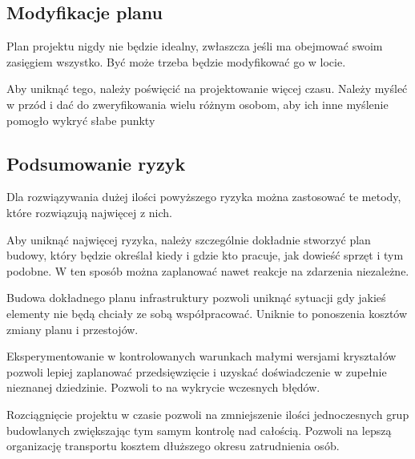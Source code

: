 \subsection{Modyfikacje planu}
Plan projektu nigdy nie będzie idealny, zwłaszcza jeśli ma obejmować swoim zasięgiem wszystko. Być może trzeba będzie modyfikować go w locie. 

Aby uniknąć tego, należy poświęcić na projektowanie więcej czasu. Należy myśleć w przód i dać do zweryfikowania wielu różnym osobom, aby ich inne myślenie pomogło wykryć słabe punkty

\subsection{Podsumowanie ryzyk}
Dla rozwiązywania dużej ilości powyższego ryzyka można zastosować te metody, które rozwiązują najwięcej z nich.

Aby uniknąć najwięcej ryzyka, należy szczególnie dokładnie stworzyć plan budowy, który będzie określał kiedy i gdzie kto pracuje, jak dowieść sprzęt i tym podobne.
W ten sposób można zaplanować nawet reakcje na zdarzenia niezależne.

Budowa dokładnego planu infrastruktury pozwoli uniknąć sytuacji gdy jakieś elementy nie będą chciały ze sobą współpracować.
Uniknie to ponoszenia kosztów zmiany planu i przestojów.

Eksperymentowanie w kontrolowanych warunkach małymi wersjami kryształów pozwoli lepiej zaplanować przedsięwzięcie i uzyskać doświadczenie w zupełnie nieznanej dziedzinie.
Pozwoli to na wykrycie wczesnych błędów.

Rozciągnięcie projektu w czasie pozwoli na zmniejszenie ilości jednoczesnych grup budowlanych zwiększając tym samym kontrolę nad całością.
Pozwoli na lepszą organizację transportu kosztem dłuższego okresu zatrudnienia osób.